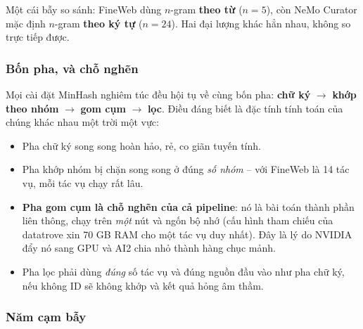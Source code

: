 \noindent Một cái bẫy so sánh: FineWeb dùng $n$-gram \textbf{theo từ} ($n=5$), còn NeMo Curator mặc định $n$-gram \textbf{theo ký tự} ($n=24$). Hai đại lượng khác hẳn nhau, không so trực tiếp được.

\subsubsection{Bốn pha, và chỗ nghẽn}

Mọi cài đặt MinHash nghiêm túc đều hội tụ về cùng bốn pha: \textbf{chữ ký} $\rightarrow$ \textbf{khớp theo nhóm} $\rightarrow$ \textbf{gom cụm} $\rightarrow$ \textbf{lọc}. Điều đáng biết là đặc tính tính toán của chúng khác nhau một trời một vực:
\begin{itemize}
	\item Pha chữ ký song song hoàn hảo, rẻ, co giãn tuyến tính.
	\item Pha khớp nhóm bị chặn song song ở đúng \emph{số nhóm} -- với FineWeb là 14 tác vụ, mỗi tác vụ chạy rất lâu.
	\item \textbf{Pha gom cụm là chỗ nghẽn của cả pipeline}: nó là bài toán thành phần liên thông, chạy trên \emph{một} nút và ngốn bộ nhớ (cấu hình tham chiếu của datatrove xin 70 GB RAM cho một tác vụ duy nhất). Đây là lý do NVIDIA đẩy nó sang GPU và AI2 chia nhỏ thành hàng chục mảnh.
	\item Pha lọc phải dùng \emph{đúng} số tác vụ và đúng nguồn đầu vào như pha chữ ký, nếu không ID sẽ không khớp và kết quả hỏng âm thầm.
\end{itemize}

\subsubsection{Năm cạm bẫy}

